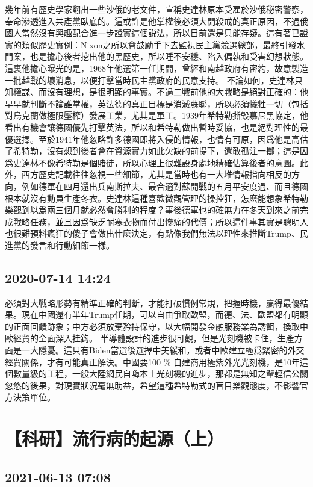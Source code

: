 \documentclass[twocolumn]{ctexart}
\begin{document}
幾年前有歷史學家翻出一些沙俄的老文件，宣稱史達林原本受雇於沙俄秘密警察，奉命滲透進入共產黨臥底的。這或許是他掌權後必須大開殺戒的真正原因，不過俄國人當然沒有興趣配合進一步證實這個説法，所以目前還是只能存疑。這有著已證實的類似歷史實例：Nixon之所以會鼓勵手下去監視民主黨競選總部，最終引發水門案，也是擔心後者挖出他的黑歷史，所以睡不安穩、陷入偏執和受害幻想狀態。這裏他擔心曝光的是，1968年他選第一任期間，曾經和南越政府有密約，故意製造一批越戰的壞消息，以便打擊當時民主黨政府的民意支持。
不論如何，史達林只知權謀、而沒有理想，是很明顯的事實。不過二戰前他的大戰略是絕對正確的：他早早就判斷不論誰掌權，英法德的真正目標是消滅蘇聯，所以必須犧牲一切（包括對烏克蘭做極限壓榨）發展工業，尤其是軍工。1939年希特勒撕毀慕尼黑協定，他看出有機會讓德國優先打擊英法，所以和希特勒做出暫時妥協，也是絕對理性的最優選擇。至於1941年他忽略許多德國即將入侵的情報，也情有可原，因爲他是高估了希特勒，沒有想到後者會在資源實力如此欠缺的前提下，還敢孤注一擲；這是因爲史達林不像希特勒是個賭徒，所以心理上很難設身處地精確估算後者的意圖。此外，西方歷史記載往往忽視一些細節，尤其是當時也有一大堆情報指向相反的方向，例如德軍在四月還出兵南斯拉夫、最合適對蘇開戰的五月平安度過、而且德國根本就沒有動員生產冬衣。史達林這種喜歡微觀管理的操控狂，怎麽能想象希特勒樂觀到以爲兩三個月就必然會勝利的程度？事後德軍也的確無力在冬天到來之前完成戰略任務，並且因爲缺乏耐寒衣物而付出慘痛的代價；所以這件事其實是聰明人也很難預料瘋狂的傻子會做出什麽決定，有點像我們無法以理性來推斷Trump、民進黨的發言和行動細節一樣。
\subsection*{2020-07-14 14:24}

必須對大戰略形勢有精準正確的判斷，才能打破慣例常規，把握時機，贏得最優結果。現在中國還有半年Trump任期，可以自由爭取歐盟，而德、法、歐盟都有明顯的正面回饋跡象；中方必須放棄矜持保守，以大幅開發金融服務業為誘餌，換取中歐經貿的全面深入挂鈎。
半導體設計的進步很可觀，但是光刻機被卡住，生產方面是一大隱憂。這只有Biden當選後選擇中美緩和，或者中歐建立極爲緊密的外交經貿關係，才有可能真正解決。中國要100 \% 自建商用極紫外光光刻機，是10年這個數量級的工程，一般大陸網民自嗨本土光刻機的進步，那都是無知之輩輕信公關忽悠的後果，對現實狀況毫無助益，希望這種希特勒式的盲目樂觀態度，不影響官方決策單位。
\section*{【科研】流行病的起源（上）}
\subsection*{2021-06-13 07:08}
\end{document}
